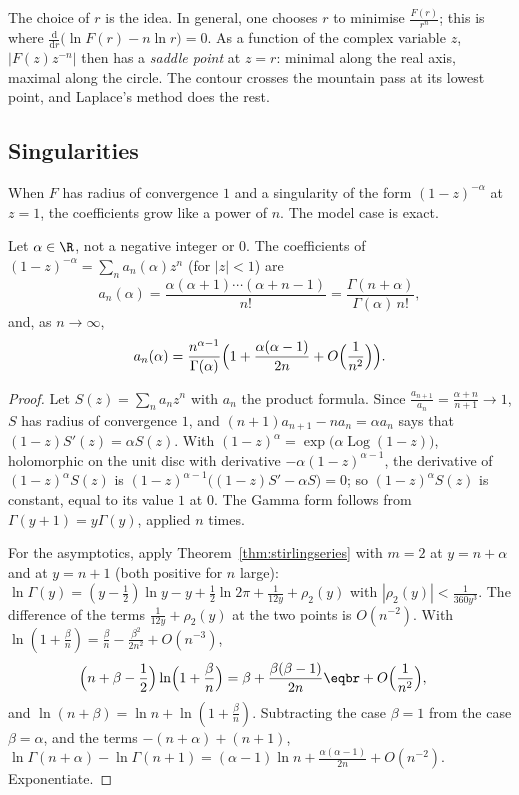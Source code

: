 The choice of $r$ is the idea. In general, one chooses $r$ to minimise $\frac{F(r)}{r^n}$; this is where $\frac{\mathrm d}{\mathrm dr}\bigl(\ln F(r)-n\ln r\bigr)=0$. As a function
of the complex variable $z$, $|F(z)z^{-n}|$ then has a \emph{saddle point} at $z=r$: minimal along the real axis, maximal along the circle. The contour
crosses the mountain pass at its lowest point, and Laplace's method does the rest.

\subsection*{Singularities}

When $F$ has radius of convergence $1$ and a singularity of the form $(1-z)^{-\alpha}$ at $z=1$, the coefficients grow like a power of $n$. The model case is
exact.

\begin{proposition}\label{prop:binomcoef}
Let $\alpha\in\R$, not a negative integer or $0$. The coefficients of $(1-z)^{-\alpha}=\sum_na_n(\alpha)z^n$ (for $|z|<1$) are
\[
a_n(\alpha)=\frac{\alpha(\alpha+1)\cdots(\alpha+n-1)}{n!}=\frac{\Gamma(n+\alpha)}{\Gamma(\alpha)\,n!},
\]
and, as $n\to\infty$,
\[
a_n(\alpha)=\frac{n^{\alpha-1}}{\Gamma(\alpha)}\Bigl(1+\frac{\alpha(\alpha-1)}{2n}+O\Bigl(\frac1{n^2}\Bigr)\Bigr).
\]
\end{proposition}
\begin{proof}
Let $S(z)=\sum_na_nz^n$ with $a_n$ the product formula. Since $\frac{a_{n+1}}{a_n}=\frac{\alpha+n}{n+1}\to1$, $S$ has radius of convergence $1$, and
$(n+1)a_{n+1}-na_n=\alpha a_n$ says that $(1-z)S'(z)=\alpha S(z)$. With $(1-z)^\alpha=\exp\bigl(\alpha\operatorname{Log}(1-z)\bigr)$, holomorphic on the unit disc with derivative
$-\alpha(1-z)^{\alpha-1}$, the derivative of $(1-z)^\alpha S(z)$ is $(1-z)^{\alpha-1}\bigl((1-z)S'-\alpha S\bigr)=0$; so $(1-z)^\alpha S(z)$ is constant, equal to its value $1$ at $0$.
The Gamma form follows from $\Gamma(y+1)=y\Gamma(y)$, applied $n$ times.

For the asymptotics, apply Theorem~\ref{thm:stirlingseries} with $m=2$ at $y=n+\alpha$ and at $y=n+1$ (both positive for $n$ large):
$\ln\Gamma(y)=(y-\frac12)\ln y-y+\frac12\ln2\pi+\frac1{12y}+\rho_2(y)$ with $|\rho_2(y)|<\frac1{360y^3}$. The difference of the terms $\frac1{12y}+\rho_2(y)$ at the two
points is $O(n^{-2})$. With $\ln(1+\frac\beta n)=\frac\beta n-\frac{\beta^2}{2n^2}+O(n^{-3})$,
\[
\begin{aligned}\Bigl(n+\beta-\frac12\Bigr)\ln\Bigl(1+\frac\beta n\Bigr)&=\beta+\frac{\beta(\beta-1)}{2n}\eqbr+O\Bigl(\frac1{n^2}\Bigr),\end{aligned}
\]
and $\ln(n+\beta)=\ln n+\ln(1+\frac\beta n)$.
Subtracting the case $\beta=1$ from the case $\beta=\alpha$, and the terms $-(n+\alpha)+(n+1)$,
$\ln\Gamma(n+\alpha)-\ln\Gamma(n+1)=(\alpha-1)\ln n+\frac{\alpha(\alpha-1)}{2n}+O(n^{-2})$. Exponentiate.
\end{proof}

